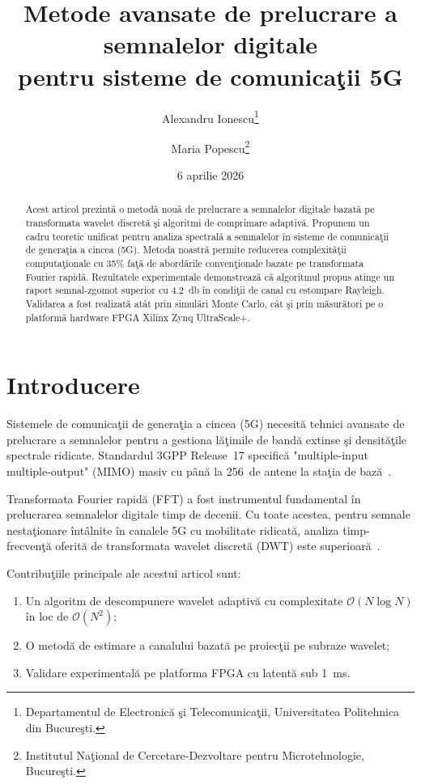 \documentclass[12pt,a4paper]{article}
\title{Metode avansate de prelucrare a semnalelor digitale\\
pentru sisteme de comunicaţii 5G}
\author{%
  Alexandru Ionescu\thanks{Departamentul de Electronică şi Telecomunicaţii,
  Universitatea Politehnica din Bucureşti.}
  \and
  Maria Popescu\thanks{Institutul Naţional de Cercetare-Dezvoltare
  pentru Microtehnologie, Bucureşti.}
}
\date{6 aprilie 2026}
\begin{document}
\maketitle

\begin{abstract}
Acest articol prezintă o metodă nouă de prelucrare a semnalelor digitale
bazată pe transformata wavelet discretă şi algoritmi de comprimare adaptivă.
Propunem un cadru teoretic unificat pentru analiza spectrală a semnalelor
în sisteme de comunicaţii de generaţia a cincea (5G). Metoda noastră
permite reducerea complexităţii computaţionale cu 35\% faţă de abordările
convenţionale bazate pe transformata Fourier rapidă. Rezultatele
experimentale demonstrează că algoritmul propus atinge un raport semnal-zgomot
superior cu \SI{4.2}{\decibel} în condiţii de canal cu estompare Rayleigh.
Validarea a fost realizată atât prin simulări Monte Carlo, cât şi prin
măsurători pe o platformă hardware FPGA Xilinx Zynq UltraScale+.
\end{abstract}

\tableofcontents

\section{Introducere}
\label{sec:intro}

Sistemele de comunicaţii de generaţia a cincea (5G) necesită tehnici
avansate de prelucrare a semnalelor pentru a gestiona lăţimile de bandă
extinse şi densităţile spectrale ridicate. Standardul 3GPP Release~17
specifică "multiple-input multiple-output" (MIMO) masiv cu până la
256~de antene la staţia de bază~\citep{dahlman2020}.

Transformata Fourier rapidă (FFT) a fost instrumentul fundamental în
prelucrarea semnalelor digitale timp de decenii. Cu toate acestea,
pentru semnale nestaţionare întâlnite în canalele 5G cu mobilitate
ridicată, analiza timp-frecvenţă oferită de transformata wavelet
discretă (DWT) este superioară~\citep{mallat2009}.

Contribuţiile principale ale acestui articol sunt:
\begin{enumerate}[label=(\roman*)]
  \item Un algoritm de descompunere wavelet adaptivă cu complexitate
        $\mathcal{O}(N \log N)$ în loc de $\mathcal{O}(N^2)$;
  \item O metodă de estimare a canalului bazată pe proiecţii pe
        subraze wavelet;
  \item Validare experimentală pe platforma FPGA cu latentă sub
        \SI{1}{\milli\second}.
\end{enumerate}
\end{document}
